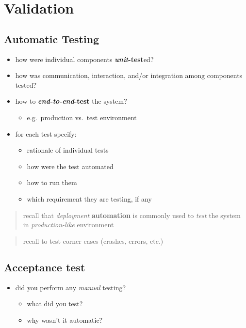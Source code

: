 \documentclass{scrartcl}
\begin{document}
\section{Validation}\label{validation}

\subsection{Automatic Testing}\label{automatic-testing}

\begin{itemize}
  \item how were individual components \textbf{\emph{unit}-test}ed?
  \item how was communication, interaction, and/or integration among
  components tested?
  \item how to \textbf{\emph{end-to-end}-test} the system?

  \begin{itemize}
    \item e.g.~production vs.~test environment
  \end{itemize}
  \item for each test specify:

  \begin{itemize}
    \item rationale of individual tests
    \item how were the test automated
    \item how to run them
    \item which requirement they are testing, if any
  \end{itemize}
\end{itemize}

\begin{quote}
recall that \emph{deployment} \textbf{automation} is commonly used to
\emph{test} the system in \emph{production-like} environment
\end{quote}

\begin{quote}
recall to test corner cases (crashes, errors, etc.)
\end{quote}

\subsection{Acceptance test}\label{acceptance-test}

\begin{itemize}
  \item did you perform any \emph{manual} testing?

  \begin{itemize}
    \item what did you test?
    \item why wasn't it automatic?
  \end{itemize}
\end{itemize}
\end{document}
